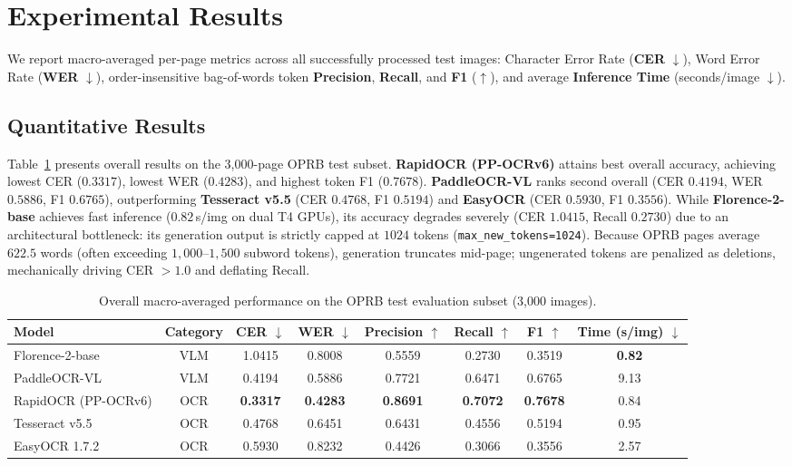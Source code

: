 \section{Experimental Results}
\label{sec:results}

We report macro-averaged per-page metrics across all successfully processed test images: Character Error Rate (\textbf{CER} $\downarrow$), Word Error Rate (\textbf{WER} $\downarrow$), order-insensitive bag-of-words token \textbf{Precision}, \textbf{Recall}, and \textbf{F1} ($\uparrow$), and average \textbf{Inference Time} (seconds/image $\downarrow$).

\subsection{Quantitative Results}
Table~\ref{tab:overall_results} presents overall results on the 3,000-page OPRB test subset. \textbf{RapidOCR (PP-OCRv6)} attains best overall accuracy, achieving lowest CER ($0.3317$), lowest WER ($0.4283$), and highest token F1 ($0.7678$). \textbf{PaddleOCR-VL} ranks second overall (CER $0.4194$, WER $0.5886$, F1 $0.6765$), outperforming \textbf{Tesseract v5.5} (CER $0.4768$, F1 $0.5194$) and \textbf{EasyOCR} (CER $0.5930$, F1 $0.3556$). While \textbf{Florence-2-base} achieves fast inference ($0.82$\,s/img on dual T4 GPUs), its accuracy degrades severely (CER $1.0415$, Recall $0.2730$) due to an architectural bottleneck: its generation output is strictly capped at $1024$ tokens (\texttt{max\_new\_tokens=1024}). Because OPRB pages average $622.5$ words (often exceeding $1,000$--$1,500$ subword tokens), generation truncates mid-page; ungenerated tokens are penalized as deletions, mechanically driving CER $>1.0$ and deflating Recall.

\begin{table}[H]
    \centering
    \caption{Overall macro-averaged performance on the OPRB test evaluation subset (3,000 images).}
    \label{tab:overall_results}
    \footnotesize
    \renewcommand{\arraystretch}{0.85}
    \begin{tabular}{lccccccc}
        \toprule
        \textbf{Model} & \textbf{Category} & \textbf{CER $\downarrow$} & \textbf{WER $\downarrow$} & \textbf{Precision $\uparrow$} & \textbf{Recall $\uparrow$} & \textbf{F1 $\uparrow$} & \textbf{Time (s/img) $\downarrow$} \\
        \midrule
        Florence-2-base & VLM & 1.0415 & 0.8008 & 0.5559 & 0.2730 & 0.3519 & \textbf{0.82} \\
        PaddleOCR-VL & VLM & 0.4194 & 0.5886 & 0.7721 & 0.6471 & 0.6765 & 9.13 \\
        RapidOCR (PP-OCRv6) & OCR & \textbf{0.3317} & \textbf{0.4283} & \textbf{0.8691} & \textbf{0.7072} & \textbf{0.7678} & 0.84 \\
        Tesseract v5.5 & OCR & 0.4768 & 0.6451 & 0.6431 & 0.4556 & 0.5194 & 0.95 \\
        EasyOCR 1.7.2 & OCR & 0.5930 & 0.8232 & 0.4426 & 0.3066 & 0.3556 & 2.57 \\
        \bottomrule
    \end{tabular}
\end{table}

